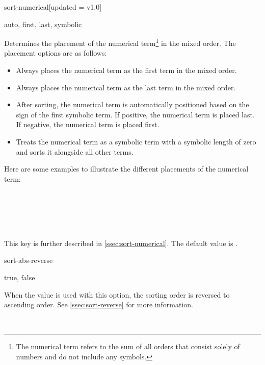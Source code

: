 \begin{option}{sort-numerical}[updated = v1.0]
	\begin{values}[default = auto]
		auto, first, last, symbolic
	\end{values}
	Determines the placement of the numerical term\footnote{The numerical term refers to the sum of all orders that consist solely of numbers and do not include any symbols.\label{foot:numerical-term}} in the mixed order. The placement options are as follows:
	\begin{itemize}[widest=, leftmargin=*]
		\item[\val{first}] Always places the numerical term as the first term in the mixed order.
		\item[\val{last}] Always places the numerical term as the last term in the mixed order.
		\item[\val{auto}] After sorting, the numerical term is automatically positioned based on the sign of the first symbolic term. If positive, the numerical term is placed last. If negative, the numerical term is placed first.
		\item[\val{symbolic}] Treats the numerical term as a symbolic term with a symbolic length of zero and sorts it alongside all other terms.
	\end{itemize}
	Here are some examples to illustrate the different placements of the numerical term:
	\begin{example}
		 \\
		 \\
		 \\
		 \\
	\end{example}
	This key is further described in \cref{ssec:sort-numerical}. The default value is \val{\default}.
\end{option}

\begin{option}{sort-abs-reverse}
	\begin{values}[default = false]
		true, false
	\end{values}
	When the value  is used with this option, the sorting order is reversed to ascending order. See \cref{ssec:sort-reverse} for more information.
	\begin{example}
		\pdv[sort-abs-reverse=false, sort-method=abs, order=2a-3b]{f}{x} \\
		\pdv[sort-abs-reverse=true, sort-method=abs, order=2a-3b]{f}{x}
	\end{example}
\end{option}

